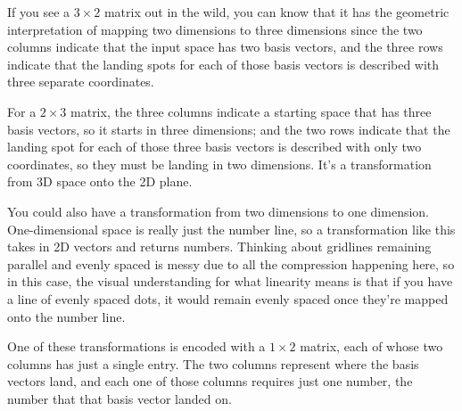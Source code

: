 If you see a $3 \times 2$ matrix out in the wild, you can know that it has the
geometric interpretation of mapping two dimensions to three dimensions since the
two columns indicate that the input space has two basis vectors, and the three
rows indicate that the landing spots for each of those basis vectors is
described with three separate coordinates.

For a $2 \times 3$ matrix, the three columns indicate a starting space that has
three basis vectors, so it starts in three dimensions; and the two rows indicate
that the landing spot for each of those three basis vectors is described with
only two coordinates, so they must be landing in two dimensions. It's a
transformation from 3D space onto the 2D plane.

You could also have a transformation from two dimensions to one dimension.
One-dimensional space is really just the number line, so a transformation like
this takes in 2D vectors and returns numbers. Thinking about gridlines remaining
parallel and evenly spaced is messy due to all the compression happening here,
so in this case, the visual understanding for what linearity means is that if
you have a line of evenly spaced dots, it would remain evenly spaced once
they're mapped onto the number line.

One of these transformations is encoded with a $1 \times 2$ matrix, each of
whose two columns has just a single entry. The two columns represent where the
basis vectors land, and each one of those columns requires just one number, the
number that that basis vector landed on.
